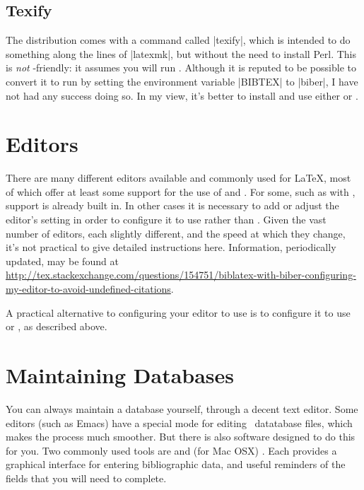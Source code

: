 \subsection{Texify}

The  distribution comes with a command called |texify|, which is intended to do something along the lines of |latexmk|, but without the need to install Perl. This is \emph{not} -friendly: it assumes you will run \bibtex. Although it is reputed to be possible to convert it to run  by setting the environment variable |BIBTEX| to |biber|, I have not had any success doing so. In my view, it's better to install and use either  or .

\section{Editors}

There are many different editors available and commonly used for \LaTeX, most of which offer at least some support for the use of  and . For some, such as  with , support is already built in. In other cases it is necessary to add or adjust the editor's setting in order to configure it to use  rather than \bibtex. Given the vast number of editors, each slightly different, and the speed at which they change, it's not practical to give detailed instructions here. Information, periodically updated, may be found at \url{http://tex.stackexchange.com/questions/154751/biblatex-with-biber-configuring-my-editor-to-avoid-undefined-citations}.

A practical alternative to configuring your editor to use  is to configure it to use  or , as described above.

\section{Maintaining Databases}

You can always maintain a database yourself, through a decent text editor. Some editors (such as Emacs) have a special mode for editing \bibtex\ datatabase files, which makes the process much smoother. But there is also software designed to do this for you. Two commonly used tools are  and (for Mac OSX) . Each provides a graphical interface for entering bibliographic data, and useful reminders of the fields that you will need to complete.

